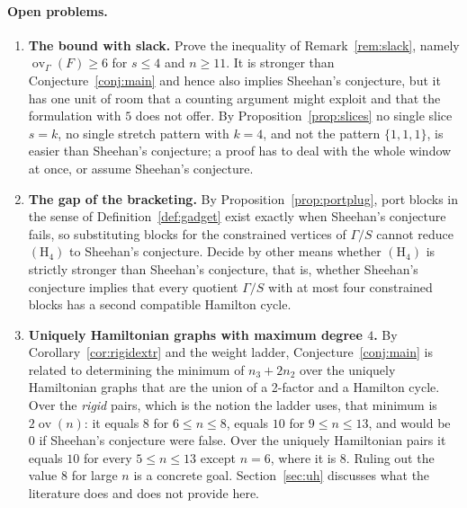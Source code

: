 \documentclass[11pt,a4paper]{article}
\theoremstyle{definition}
\theoremstyle{remark}
\newcommand{\ov}{\operatorname{ov}}
\begin{document}
\paragraph{Open problems.}
\begin{enumerate}
\item \textbf{The bound with slack.} Prove the inequality of Remark~\ref{rem:slack}, namely $\ov_\Gamma(F)\ge6$ for $s\le4$ and $n\ge11$. It is stronger than Conjecture~\ref{conj:main} and hence also implies Sheehan's conjecture, but it has one unit of room that a counting argument might exploit and that the formulation with $5$ does not offer. By Proposition~\ref{prop:slices} no single slice $s=k$, no single stretch pattern with $k=4$, and not the pattern $\{1,1,1\}$, is easier than Sheehan's conjecture; a proof has to deal with the whole window at once, or assume Sheehan's conjecture.
\item \textbf{The gap of the bracketing.} By Proposition~\ref{prop:portplug}, port blocks in the sense of Definition~\ref{def:gadget} exist exactly when Sheehan's conjecture fails, so substituting blocks for the constrained vertices of $\Gamma/S$ cannot reduce $(\mathrm{H}_4)$ to Sheehan's conjecture. Decide by other means whether $(\mathrm{H}_4)$ is strictly stronger than Sheehan's conjecture, that is, whether Sheehan's conjecture implies that every quotient $\Gamma/S$ with at most four constrained blocks has a second compatible Hamilton cycle.
\item \textbf{Uniquely Hamiltonian graphs with maximum degree $4$.} By Corollary~\ref{cor:rigidextr} and the weight ladder, Conjecture~\ref{conj:main} is related to determining the minimum of $n_3+2n_2$ over the uniquely Hamiltonian graphs that are the union of a 2-factor and a Hamilton cycle. Over the \emph{rigid} pairs, which is the notion the ladder uses, that minimum is $2\ov(n)$: it equals $8$ for $6\le n\le8$, equals $10$ for $9\le n\le13$, and would be $0$ if Sheehan's conjecture were false. Over the uniquely Hamiltonian pairs it equals $10$ for every $5\le n\le13$ except $n=6$, where it is $8$. Ruling out the value $8$ for large $n$ is a concrete goal. Section~\ref{sec:uh} discusses what the literature does and does not provide here.

\end{enumerate}
\end{document}
